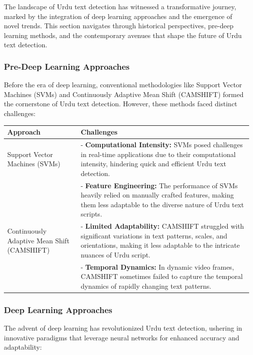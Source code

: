\documentclass[default,iicol]{sn-jnl}%
\begin{document}
The landscape of Urdu text detection has witnessed a transformative journey, marked by the integration of deep learning approaches and the emergence of novel trends. This section navigates through historical perspectives, pre-deep learning methods, and the contemporary avenues that shape the future of Urdu text detection.

\subsubsection{Pre-Deep Learning Approaches}

Before the era of deep learning, conventional methodologies like Support Vector Machines (SVMs) and Continuously Adaptive Mean Shift (CAMSHIFT) formed the cornerstone of Urdu text detection. However, these methods faced distinct challenges:

\begin{center}
	\begin{tabular}{|p{3cm}|p{6cm}|}
		\hline
		\textbf{Approach} & \textbf{Challenges} \\
		\hline
		Support Vector Machines (SVMs) & 
		- \textbf{Computational Intensity:} SVMs posed challenges in real-time applications due to their computational intensity, hindering quick and efficient Urdu text detection. \\
		& - \textbf{Feature Engineering:} The performance of SVMs heavily relied on manually crafted features, making them less adaptable to the diverse nature of Urdu text scripts. \\
		\hline
		Continuously Adaptive Mean Shift (CAMSHIFT) & 
		- \textbf{Limited Adaptability:} CAMSHIFT struggled with significant variations in text patterns, scales, and orientations, making it less adaptable to the intricate nuances of Urdu script. \\
		& - \textbf{Temporal Dynamics:} In dynamic video frames, CAMSHIFT sometimes failed to capture the temporal dynamics of rapidly changing text patterns. \\
		\hline
	\end{tabular}
\end{center}

\subsubsection{Deep Learning Approaches}

The advent of deep learning has revolutionized Urdu text detection, ushering in innovative paradigms that leverage neural networks for enhanced accuracy and adaptability:
\end{document}
